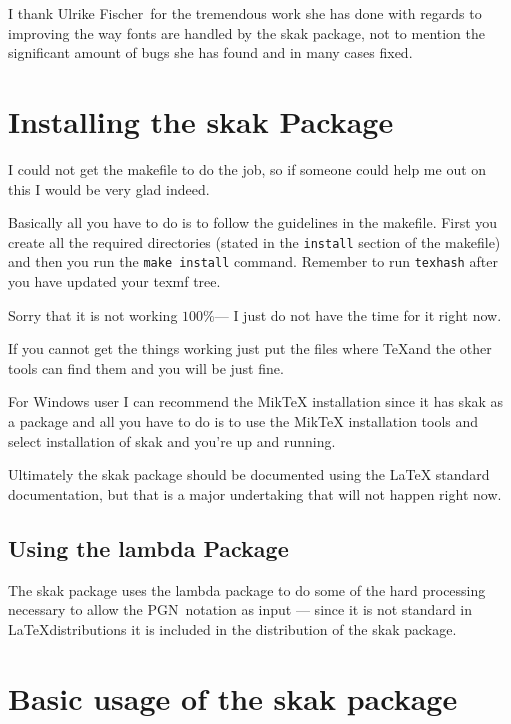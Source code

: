 \documentclass[10pt]{article}
\newcommand{\package}[1]{\textsf{#1}}
\newcommand{\pgn}{PGN\ }
\newcommand{\Ulrike}{Ulrike Fischer\ }
\begin{document}
I thank \Ulrike for the tremendous work she has done with regards to
improving the way fonts are handled by the skak package, not to
mention the significant amount of bugs she has found and in many cases
fixed.


\section{Installing the \package{skak} Package}
\label{sec:install}

I could not get the makefile to do the job, so if someone could help
me out on this I would be very glad indeed.

Basically all you have to do is to follow the guidelines in the
makefile. First you create all the required directories (stated in the
\texttt{install} section of the makefile) and then you run the
\texttt{make install} command. Remember to run \texttt{texhash} after
you have updated your texmf tree.

Sorry that it is not working $100\%$--- I just do not have the time for
it right now.

If you cannot get the things working just put the files where \TeX and
the other tools can find them and you will be just fine.

For Windows user I can recommend the MikTeX installation since it has
skak as a package and all you have to do is to use the MikTeX
installation tools and select installation of skak and you're up and
running.

Ultimately the skak package should be documented using the \LaTeX
standard documentation, but that is a major undertaking that will not
happen right now.

\subsection{Using the \package{lambda} Package}
\label{sec:using-lambda}

The \package{skak} package uses the \package{lambda} package to do
some of the hard processing necessary to allow the \pgn notation as
input --- since it is not standard in \LaTeX distributions it is
included in the distribution of the \package{skak} package.


\section{Basic usage of the \package{skak} package}
\label{sec:basic-usage}
\end{document}

